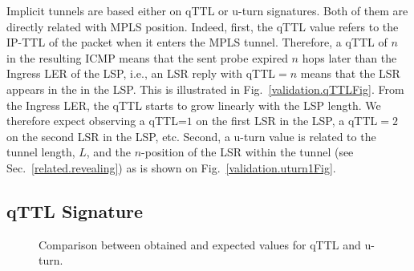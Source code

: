 
Implicit tunnels are based either on qTTL or u-turn signatures. Both of them are
directly related with MPLS position.  Indeed, first, the qTTL value refers to
the IP-TTL of the \echorequest packet when it enters the MPLS tunnel.
Therefore, a qTTL of $n$ in the resulting ICMP \ttlexceeded means that the sent
probe expired $n$ hops later than the Ingress LER of the LSP, i.e., an LSR reply
with qTTL$=n$ means that the LSR appears in the  in the LSP.
This is illustrated in Fig.~\ref{validation.qTTLFig}.  From the Ingress LER, the
qTTL starts to grow linearly with the LSP length.  We therefore expect observing
a qTTL=$1$ on the first LSR in the LSP, a qTTL$=2$ on the second LSR in the LSP,
etc.  Second, a u-turn value is related to the tunnel length, $L$, and the
$n$-position of the LSR within the tunnel (see Sec.~\ref{related.revealing}) as
is shown on Fig.~\ref{validation.uturn1Fig}.

\subsection{qTTL Signature}\label{validation.qttl}
\begin{figure}[!t]
  \begin{center}
\hspace{-0.3cm}      
  \end{center}
  \caption{Comparison between obtained and expected values for qTTL and u-turn.}
  \label{validation.qttl.fig}
\end{figure}

